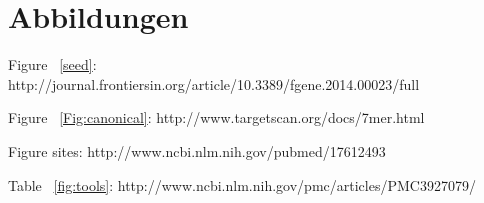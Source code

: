\documentclass[12pt]{article}
\begin{document}



\section{Abbildungen}
Figure ~\ref{seed}: http://journal.frontiersin.org/article/10.3389/fgene.2014.00023/full

Figure ~\ref{Fig:canonical}: http://www.targetscan.org/docs/7mer.html

Figure sites: http://www.ncbi.nlm.nih.gov/pubmed/17612493

Table ~\ref{fig:tools}: http://www.ncbi.nlm.nih.gov/pmc/articles/PMC3927079/
\end{document}
